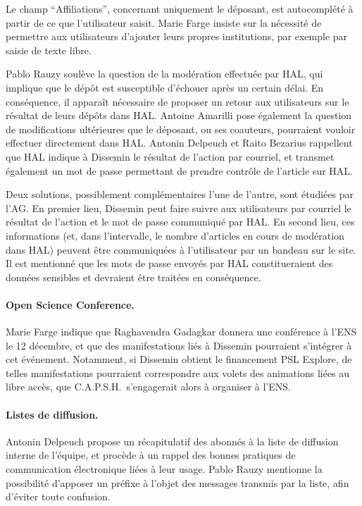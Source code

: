 \documentclass{scrartcl}
\begin{document}
Le champ ``Affiliations'', concernant uniquement le déposant, est autocomplété à
partir de ce que l'utilisateur saisit. Marie Farge insiste sur la nécessité de
permettre aux utilisateurs d'ajouter leurs propres institutions, par exemple par
saisie de texte libre.

Pablo Rauzy soulève la question de la modération effectuée par HAL, qui implique
que le dépôt est susceptible d'échouer après un certain délai. En conséquence,
il apparaît nécessaire de proposer un retour aux utilisateurs sur le résultat de
leurs dépôts dans HAL. Antoine Amarilli pose également la question de
modifications ultérieures que le déposant, ou ses coauteurs, pourraient vouloir
effectuer directement dans HAL. Antonin Delpeuch et Raito Bezarius rappellent
que HAL indique à Dissemin le résultat de l'action par courriel, et transmet
également un mot de passe permettant de prendre contrôle de l'article sur HAL.

Deux solutions, possiblement complémentaires l'une de l'autre, sont étudiées par l'AG. En premier lieu, Dissemin
peut faire suivre aux utilisateurs par courriel le résultat de l'action et le
mot de passe communiqué par HAL. En second lieu, ces informations (et, dans
l'intervalle, le nombre d'articles en cours de modération dans HAL) peuvent être
communiquées à l'utilisateur par un bandeau sur le site. Il est mentionné que
les mots de passe envoyés par HAL constitueraient des données sensibles et
devraient être traitées en conséquence.

\paragraph{Open Science Conference.}
Marie Farge indique que Raghavendra Gadagkar donnera une conférence à l'ENS le
12 décembre, et que des manifestations liés à Dissemin pourraient s'intégrer à
cet événement. Notamment, si Dissemin obtient le financement PSL Explore, de
telles manifestations pourraient correspondre aux volets des animations liées au
libre accès, que C.A.P.S.H.\ s'engagerait alors à organiser à l'ENS.

\paragraph{Listes de diffusion.}
Antonin Delpeuch propose un récapitulatif des abonnés à la liste de diffusion
interne de l'équipe, et procède à un rappel des bonnes pratiques de
communication électronique liées à leur usage. Pablo Rauzy mentionne la
possibilité d'apposer un préfixe à l'objet des messages transmis par la liste,
afin d'éviter toute confusion.
\end{document}
